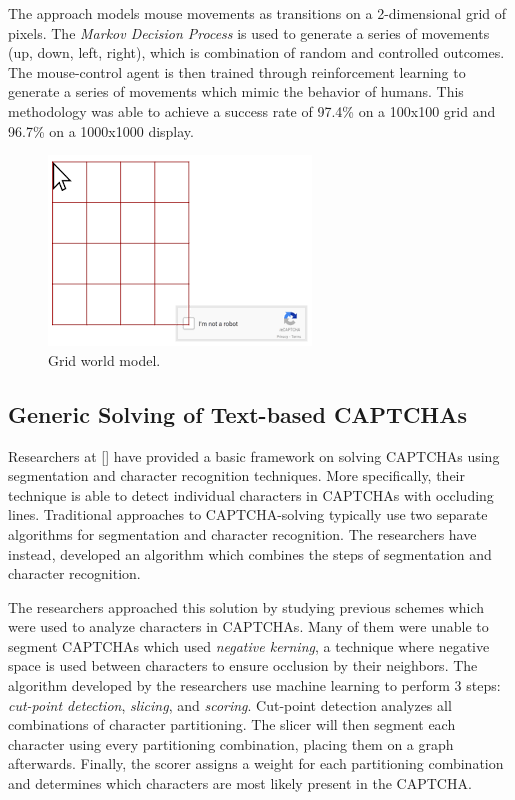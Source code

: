 \documentclass[11pt,conference]{IEEEtran}
\begin{document}
The approach models mouse movements as transitions on a 2-dimensional grid
of pixels. The \emph{Markov Decision Process} is used to generate a series of
movements (up, down, left, right), which is combination of random and controlled
outcomes. The mouse-control agent is then trained through reinforcement
learning to generate a series of movements which mimic the behavior of humans.
This methodology was able to achieve a success rate of 97.4\% on a 100x100
grid and 96.7\% on a 1000x1000 display.

\begin{figure}[htbp]
	\centerline{\includegraphics[scale=0.5]{images/grid-world.png}}
	\caption{Grid world model.}
	\label{figure}
\end{figure}

\subsection{Generic Solving of Text-based CAPTCHAs}
Researchers at [] have provided a basic framework on solving CAPTCHAs using
segmentation and character recognition techniques. More specifically, their
technique is able to detect individual characters in CAPTCHAs with occluding
lines. Traditional approaches to CAPTCHA-solving typically use two separate
algorithms for segmentation and character recognition. The researchers have
instead, developed an algorithm which combines the steps of segmentation and character
recognition.

The researchers approached this solution by studying previous schemes which
were used to analyze characters in CAPTCHAs. Many of them were unable to
segment CAPTCHAs which used \emph{negative kerning}, a technique
where negative space is used between characters to ensure occlusion 
by their neighbors. The algorithm developed by the researchers use machine
learning to perform 3 steps: \emph{cut-point detection}, \emph{slicing}, and
\emph{scoring}.
Cut-point detection analyzes all combinations of character partitioning. The
slicer will then segment each character using every partitioning combination,
placing them on a graph afterwards. Finally, the scorer assigns a weight for
each partitioning combination and determines which characters are most likely
present in the CAPTCHA.
\end{document}
